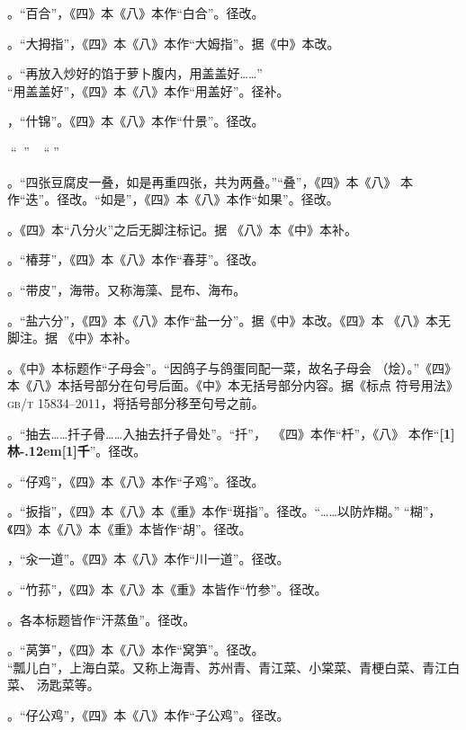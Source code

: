 。“百合”，《四》本《八》本作“白合”。径改。

。“大拇指”，《四》本《八》本作“大姆指”。据《中》本改。

。“再放入炒好的馅于萝卜腹内，用盖盖好……”\\%
“用盖盖好”，《四》本《八》本作“用盖好”。径补。

，“什锦”。《四》本《八》本作“什景”。径改。

，“𥑲水”。盐卤。“𥑲”字疑误。

。“四张豆腐皮一叠，如是再重四张，共为两叠。”“叠”，《四》本《八》
本作“迭”。径改。“如是”，《四》本《八》本作“如果”。径改。

。《四》本“八分火”之后无脚注标记{\footnotesize{}}。据
《八》本《中》本补。

。“椿芽”，《四》本《八》本作“春芽”。径改。

。“带皮”，海带。又称海藻、昆布、海布。

。“盐六分”，《四》本《八》本作“盐一分”。据《中》本改。《四》本
《八》本无脚注{\footnotesize{}}。据
《中》本补。

。《中》本标题作“子母会”。“因鸽子与鸽蛋同配一菜，故名子母会
（烩）。”《四》本《八》本括号部分在句号后面。《中》本无括号部分内容。据《标点
符号用法》\textsc{gb/t 15834--2011}，将括号部分移至句号之前。

。“抽去……扦子骨……入抽去扦子骨处”。“扦”，~《四》本作“杄”，《八》
本作“{\bfseries\scalebox{.65}[1]{林}\kern-.12em\scalebox{.55}[1]{千}}”。径改。

。“仔鸡”，《四》本《八》本作“子鸡”。径改。

。“扳指”，《四》本《八》本《重》本作“斑指”。径改。“……以防炸糊。”
“糊”，《四》本《八》本《重》本皆作“胡”。径改。

，“汆一道”。《四》本《八》本作“川一道”。径改。

。“竹荪”，《四》本《八》本《重》本皆作“竹参”。径改。

。各本标题皆作“汗蒸鱼”。径改。

。“莴笋”，《四》本《八》本作“窝笋”。径改。\\%
“瓢儿白”，上海白菜。又称上海青、苏州青、青江菜、小棠菜、青梗白菜、青江白菜、
汤匙菜等。

。“仔公鸡”，《四》本《八》本作“子公鸡”。径改。

\endgroup%

